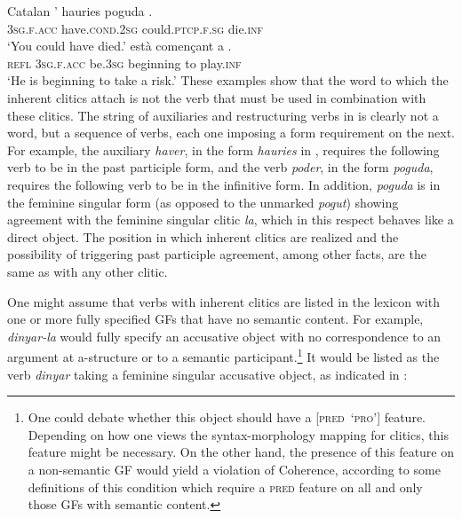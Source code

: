 \documentclass[output=paper,hidelinks]{langscibook}
\begin{document}
\ea\label{ex:Romance:16}   Catalan
\ea\label{ex:Romance:16a}
\gll
{}' hauries poguda .\\
\textsc{3sg.f.acc} have.\textsc{cond.2sg} could.\textsc{ptcp.f.sg} die.\textsc{inf}\\
\glt `You could have died.'
\ex\label{ex:Romance:16b}
\gll
{}  està començant a .\\
\textsc{refl} \textsc{3sg.f.acc} be.\textsc{3sg} beginning to play.\textsc{inf}\\
\glt   `He is beginning to take a risk.'
\z\z
These examples show that the word to which the inherent clitics attach is not the verb that must be used in combination with these clitics. The string of auxiliaries and restructuring verbs in  is clearly not a word, but a sequence of verbs, each one imposing a form requirement on the next. For example, the auxiliary \textit{haver}, in the form \textit{hauries} in , requires the following verb to be in the past participle form, and the verb \textit{poder}, in the form \textit{poguda}, requires the following verb to be in the infinitive form. In addition, \textit{poguda} is in the feminine singular form (as opposed to the unmarked \textit{pogut}) showing agreement with the feminine singular clitic \textit{la}, which in this respect behaves like a direct object. The position in which inherent clitics are realized and the possibility of triggering past participle agreement, among other facts, are the same as with any other clitic.

One might assume that verbs with inherent clitics are listed in the lexicon with one or more fully specified GFs that have no semantic content. For example, \textit{dinyar-la} would fully specify an accusative object with no correspondence to an argument at a-structure or to a semantic participant.\footnote{One could debate whether this object should have a [\textsc{pred~`pro'}] feature. Depend\-ing on how one views the syntax-morphology mapping for clitics, this feature might be necessary. On the other hand, the presence of this feature on a non-semantic GF would yield a violation of Coherence, according to some definitions of this condition which require a \textsc{pred} feature on all and only those GFs with semantic content.} It would be listed as the verb \textit{dinyar} taking a feminine singular accusative object, as indicated in :

\ea\label{ex:Romance:17}
  \z
\end{document}
